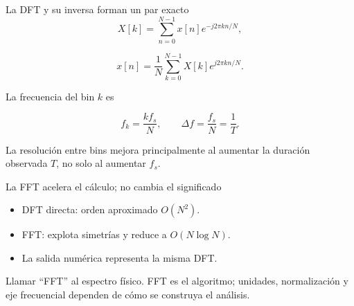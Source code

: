 \documentclass[
  ignorenonframetext,
  aspectratio=169,
  spanish,
  professionalfonts]{beamer}
\providecommand{\tightlist}{%
  \setlength{\itemsep}{0pt}\setlength{\parskip}{0pt}}
\begin{document}
\begin{frame}[shrink]{La DFT y su inversa forman un par exacto}
\protect{}\label{la-dft-y-su-inversa-forman-un-par-exacto}
\[
X[k]=\sum_{n=0}^{N-1}x[n]e^{-j2\pi kn/N},
\]

\[
x[n]=\frac{1}{N}\sum_{k=0}^{N-1}X[k]e^{j2\pi kn/N}.
\]

La frecuencia del bin \(k\) es

\[
f_k=\frac{k f_s}{N},\qquad \Delta f=\frac{f_s}{N}=\frac{1}{T}.
\]

\begin{tcolorbox}[enhanced jigsaw, arc=.35mm, bottomrule=.15mm, bottomtitle=1mm, breakable, colback=white, colbacktitle=quarto-callout-note-color!10!white, colframe=quarto-callout-note-color-frame, coltitle=black, left=2mm, leftrule=.75mm, opacityback=0, opacitybacktitle=0.6, rightrule=.15mm, title={Interpretación}, titlerule=0mm, toprule=.15mm, toptitle=1mm]

La resolución entre bins mejora principalmente al aumentar la duración
observada \(T\), no solo al aumentar \(f_s\).

\end{tcolorbox}
\end{frame}

\begin{frame}{La FFT acelera el cálculo; no cambia el significado}
\protect{}\label{la-fft-acelera-el-cuxe1lculo-no-cambia-el-significado}
\begin{itemize}
\tightlist
\item
  DFT directa: orden aproximado \(O(N^2)\).
\item
  FFT: explota simetrías y reduce a \(O(N\log N)\).
\item
  La salida numérica representa la misma DFT.
\end{itemize}

\begin{tcolorbox}[enhanced jigsaw, arc=.35mm, bottomrule=.15mm, bottomtitle=1mm, breakable, colback=white, colbacktitle=quarto-callout-warning-color!10!white, colframe=quarto-callout-warning-color-frame, coltitle=black, left=2mm, leftrule=.75mm, opacityback=0, opacitybacktitle=0.6, rightrule=.15mm, title={Error frecuente}, titlerule=0mm, toprule=.15mm, toptitle=1mm]

Llamar ``FFT'' al espectro físico. FFT es el algoritmo; unidades,
normalización y eje frecuencial dependen de cómo se construya el
análisis.

\end{tcolorbox}
\end{frame}
\end{document}
